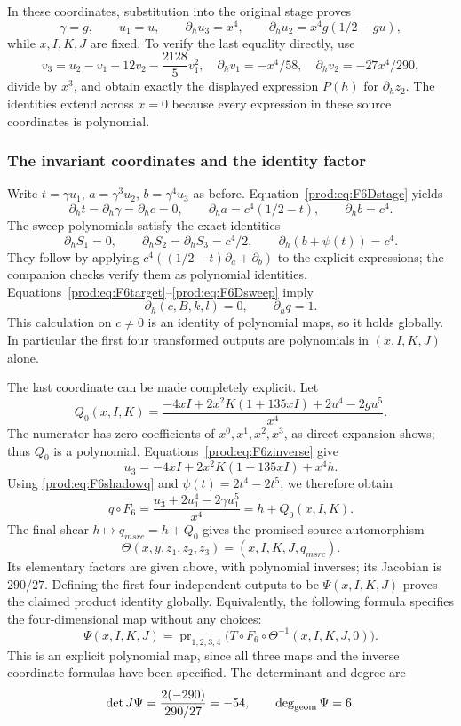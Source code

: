 \documentclass[11pt]{article}
\numberwithin{equation}{section}
\theoremstyle{plain}
\theoremstyle{definition}
\theoremstyle{remark}
\begin{document}
In these coordinates, substitution into the original stage proves
\begin{equation}\label{prod:eq:F6Dstage}
 \gamma=g,\qquad u_1=u,\qquad
 \partial_hu_3=x^4,\qquad
 \partial_hu_2=x^4g(1/2-gu),
\end{equation}
while $x,I,K,J$ are fixed. To verify the last equality directly, use
\[
 v_3=u_2-v_1+12v_2-\frac{2128}{5}v_1^2,
 \quad \partial_hv_1=-x^4/58,\quad
 \partial_hv_2=-27x^4/290,
\]
divide by $x^3$, and obtain exactly the displayed expression $P(h)$ for
$\partial_hz_2$. The identities extend across $x=0$ because every expression
in these source coordinates is polynomial.

\subsubsection{The invariant coordinates and the identity factor}
Write $t=\gamma u_1$, $a=\gamma^3u_2$, $b=\gamma^4u_3$ as before.
Equation~\eqref{prod:eq:F6Dstage} yields
\[
 \partial_ht=\partial_h\gamma=\partial_hc=0,\qquad
 \partial_ha=c^4(1/2-t),\qquad \partial_hb=c^4.
\]
The sweep polynomials satisfy the exact identities
\begin{equation}\label{prod:eq:F6Dsweep}
 \partial_hS_1=0,\qquad
 \partial_hS_2=\partial_hS_3=c^4/2,\qquad
 \partial_h(b+\psi(t))=c^4.
\end{equation}
They follow by applying $c^4((1/2-t)\partial_a+\partial_b)$ to the
explicit expressions; the companion checks verify them as polynomial
identities. Equations~\eqref{prod:eq:F6target}--\eqref{prod:eq:F6Dsweep} imply
\[
 \partial_h(c,B,k,l)=0,\qquad \partial_hq=1.
\]
This calculation on $c\ne0$ is an identity of polynomial maps, so it holds
globally. In particular the first four transformed outputs are polynomials
in $(x,I,K,J)$ alone.

The last coordinate can be made completely explicit. Let
\begin{equation}\label{prod:eq:F6Q0}
 Q_0(x,I,K)=
 \frac{-4xI+2x^2K(1+135xI)+2u^4-2gu^5}{x^4}.
\end{equation}
The numerator has zero coefficients of $x^0,x^1,x^2,x^3$, as direct expansion
shows; thus $Q_0$ is a polynomial. Equations~\eqref{prod:eq:F6zinverse} give
\[
 u_3=-4xI+2x^2K(1+135xI)+x^4h.
\]
Using \eqref{prod:eq:F6shadowq} and $\psi(t)=2t^4-2t^5$, we therefore obtain
\[
 q\circ F_6=\frac{u_3+2u_1^4-2\gamma u_1^5}{x^4}=h+Q_0(x,I,K).
\]
The final shear $h\mapsto q_{
m src}=h+Q_0$ gives the promised source
automorphism
\[
 \Theta(x,y,z_1,z_2,z_3)=(x,I,K,J,q_{
m src}).
\]
Its elementary factors are given above, with polynomial inverses; its
Jacobian is $290/27$. Defining the first four independent outputs to be
$\Psi(x,I,K,J)$ proves the claimed product identity globally. Equivalently,
the following formula specifies the four-dimensional map without any choices:
\[
 \Psi(x,I,K,J)=\operatorname{pr}_{1,2,3,4}
 \bigl(T\circ F_6\circ\Theta^{-1}(x,I,K,J,0)\bigr).
\]
This is an explicit polynomial map, since all three maps and the inverse
coordinate formulas have been specified. The determinant and degree are
\[
 \det J\Psi=\frac{2(-290)}{290/27}=-54,\qquad \deg_{\rm geom}\Psi=6.
\]
\end{document}
